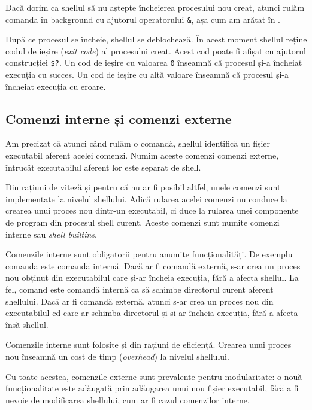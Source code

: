 Dacă dorim ca shellul să nu aștepte încheierea procesului nou creat, atunci
rulăm comanda în background cu ajutorul operatorului \texttt{\&}, așa cum am arătat în
.

După ce procesul se încheie, shellul se deblochează. În
acest moment shellul reține codul de ieșire (\textit{exit code}) al procesului creat.
Acest cod poate fi afișat cu ajutorul construcției \texttt{\$?}.
Un cod de ieșire cu valoarea \texttt{0} înseamnă că procesul și-a încheiat execuția cu succes.
Un cod de ieșire cu altă valoare înseamnă că procesul și-a încheiat execuția cu eroare.

\subsection{Comenzi interne și comenzi externe}
\label{sec:cli:shell:command-types}

Am precizat că atunci când rulăm o comandă, shellul identifică un fișier
executabil aferent acelei comenzi. Numim aceste comenzi comenzi externe,
întrucât executabilul aferent lor este separat de shell.

Din rațiuni de viteză și pentru că nu ar fi posibil altfel, unele comenzi sunt
implementate la nivelul shellului. Adică rularea acelei comenzi nu conduce la
crearea unui proces nou dintr-un executabil, ci duce la rularea unei componente
de program din procesul shell curent. Aceste comenzi sunt numite comenzi interne
sau \textit{shell builtins}.

Comenzile interne sunt obligatorii pentru anumite funcționalități. De exemplu
comanda  este comandă internă. Dacă ar fi comandă externă, s-ar crea un
proces nou obținut din executabilul  care și-ar încheia execuția, fără a
afecta shellul. La fel, comand  este comandă internă ca să schimbe directorul
curent aferent shellului. Dacă ar fi comandă externă, atunci s-ar crea un
proces nou din executabilul cd care ar schimba directorul și și-ar încheia
execuția, fără a afecta însă shellul.

Comenzile interne sunt folosite și din rațiuni de eficiență. Crearea unui proces
nou înseamnă un cost de timp (\textit{overhead}) la nivelul shellului.

Cu toate acestea, comenzile externe sunt prevalente pentru modularitate: o nouă
funcționalitate este adăugată prin adăugarea unui nou fișier executabil, fără a
fi nevoie de modificarea shellului, cum ar fi cazul comenzilor interne.

